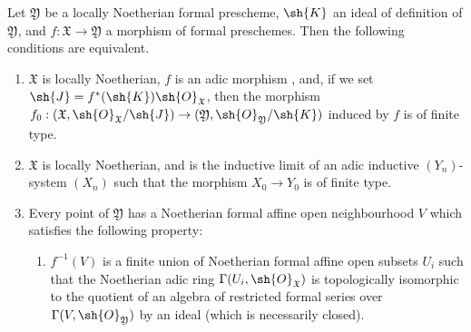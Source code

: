 \begin{proposition}[10.13.1]
\label{I.10.13.1}
Let $\mathfrak{Y}$ be a locally Noetherian formal prescheme, $\sh{K}$ an ideal of definition of $\mathfrak{Y}$, and $f:\mathfrak{X}\to\mathfrak{Y}$ a morphism of formal preschemes.
Then the following conditions are equivalent.
\begin{enumerate}
  \item[\rm{(a)}] $\mathfrak{X}$ is locally Noetherian, $f$ is an adic morphism , and, if we set $\sh{J}=f^*(\sh{K})\sh{O}_\mathfrak{X}$, then the morphism $f_0:(\mathfrak{X},\sh{O}_\mathfrak{X}/\sh{J})\to(\mathfrak{Y},\sh{O}_\mathfrak{Y}/\sh{K})$ induced by $f$ is of finite type.
  \item[\rm{(b)}] $\mathfrak{X}$ is locally Noetherian, and is the inductive limit of an adic inductive $(Y_n)$-system $(X_n)$ such that the morphism $X_0\to Y_0$ is of finite type.
  \item[\rm{(c)}] Every point of $\mathfrak{Y}$ has a Noetherian formal affine open neighbourhood $V$ which satisfies the following property:
\begin{enumerate}
  \item[(\textbf{Q})] $f^{-1}(V)$ is a finite union of Noetherian formal affine open subsets $U_i$ such that the Noetherian adic ring $\Gamma(U_i,\sh{O}_\mathfrak{X})$ is topologically isomorphic to the quotient of an algebra of restricted formal series  over $\Gamma(V,\sh{O}_\mathfrak{Y})$ by an ideal (which is necessarily closed).
\end{enumerate}
\end{enumerate}
\end{proposition}

